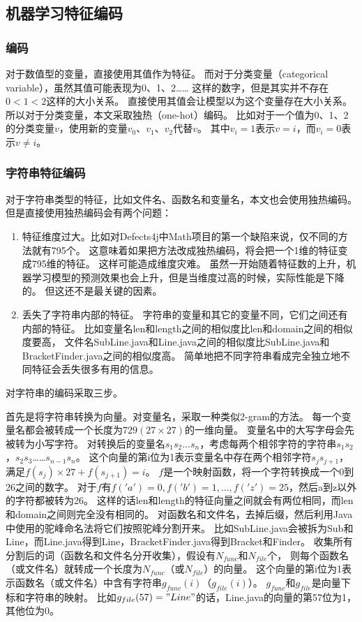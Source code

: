 \subsection{机器学习特征编码}

\subsubsection{编码}

对于数值型的变量，直接使用其值作为特征。
而对于分类变量（categorical variable），虽然其值可能表现为0、1、2……
这样的数字，但是其实并不存在$0 < 1 < 2$这样的大小关系。
直接使用其值会让模型以为这个变量存在大小关系。
所以对于分类变量，本文采取独热（one-hot）编码。
比如对于一个值为0、1、2的分类变量$v$，使用新的变量$v_0$、$v_1$、$v_2$代替$v$。
其中$v_i = 1$表示$v = i$，而$v_i = 0$表示$v \ne i$。

\subsubsection{字符串特征编码}

对于字符串类型的特征，比如文件名、函数名和变量名，本文也会使用独热编码。
但是直接使用独热编码会有两个问题：
\begin{enumerate}
\item 特征维度过大。比如对Defects4j中Math项目的第一个缺陷来说，仅不同的方法就有795个。
这意味着如果把方法改成独热编码，将会把一个1维的特征变成795维的特征。
这样可能造成维度灾难\parencite{Richard1957Dynamic}。
虽然一开始随着特征数的上升，机器学习模型的预测效果也会上升，但是当维度过高的时候，实际性能是下降的。
但这还不是最关键的因素。
\item 丢失了字符串内部的特征。
字符串的变量和其它的变量不同，它们之间还有内部的特征。
比如变量名len和length之间的相似度比len和domain之间的相似度要高，
文件名SubLine.java和Line.java之间的相似度比SubLine.java和BracketFinder.java之间的相似度高。
简单地把不同字符串看成完全独立地不同特征会丢失很多有用的信息。
\end{enumerate}

对字符串的编码采取三步。

首先是将字符串转换为向量。对变量名，采取一种类似2-gram的方法。
每一个变量名都会被转成一个长度为$729 (27 \times 27)$的一维向量。
变量名中的大写字母会先被转为小写字符。
对转换后的变量名$s_1s_2...s_n$，考虑每两个相邻字符的字符串$s_1s_2$，$s_2s_3$……$s_{n - 1}s_n$。
这个向量的第i位为1表示变量名中存在两个相邻字符$s_js_{j+1}$，满足$f(s_j) \times 27 + f(s_{j + 1}) = i$。
$f$是一个映射函数，将一个字符转换成一个0到26之间的数字。
对于$f$有$f('a') = 0, f('b') = 1, ..., f('z') = 25$，然后a到z以外的字符都被转为26。
这样的话len和length的特征向量之间就会有两位相同，而len和domain之间则完全没有相同的。
对函数名和文件名，去掉后缀，然后利用Java中使用的驼峰命名法将它们按照驼峰分割开来。
比如SubLine.java会被拆为Sub和Line，而Line.java得到Line，BracketFinder.java得到Bracket和Finder。
收集所有分割后的词（函数名和文件名分开收集），假设有$N_{func}$和$N_{file}$个，
则每个函数名（或文件名）就转成一个长度为$N_{func}$（或$N_{file}$）的向量。
这个向量的第i位为1表示函数名（或文件名）中含有字符串$g_{func}(i)$（$g_{file}(i)$）。
$g_{func}$和$g_{file}$是向量下标和字符串的映射。
比如$g_{file}(57) = "Line"$的话，Line.java的向量的第57位为1，其他位为0。

